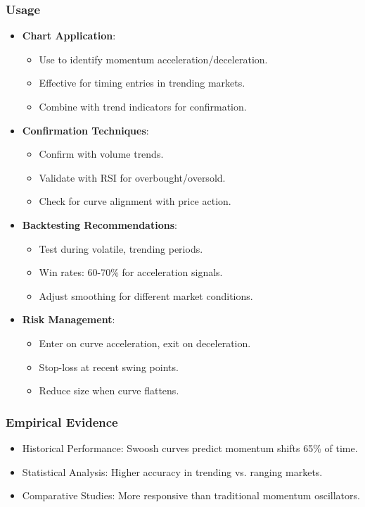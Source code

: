 \documentclass[12pt]{article}
\begin{document}
\subsubsection{Usage}
\begin{itemize}
\item \textbf{Chart Application}:
  \begin{itemize}
  \item Use to identify momentum acceleration/deceleration.
  \item Effective for timing entries in trending markets.
  \item Combine with trend indicators for confirmation.
  \end{itemize}
\item \textbf{Confirmation Techniques}:
  \begin{itemize}
  \item Confirm with volume trends.
  \item Validate with RSI for overbought/oversold.
  \item Check for curve alignment with price action.
  \end{itemize}
\item \textbf{Backtesting Recommendations}:
  \begin{itemize}
  \item Test during volatile, trending periods.
  \item Win rates: 60-70\% for acceleration signals.
  \item Adjust smoothing for different market conditions.
  \end{itemize}
\item \textbf{Risk Management}:
  \begin{itemize}
  \item Enter on curve acceleration, exit on deceleration.
  \item Stop-loss at recent swing points.
  \item Reduce size when curve flattens.
  \end{itemize}
\end{itemize}

\subsubsection{Empirical Evidence}
\begin{itemize}
\item Historical Performance: Swoosh curves predict momentum shifts 65\% of time.
\item Statistical Analysis: Higher accuracy in trending vs. ranging markets.
\item Comparative Studies: More responsive than traditional momentum oscillators.
\end{itemize}
\end{document}
